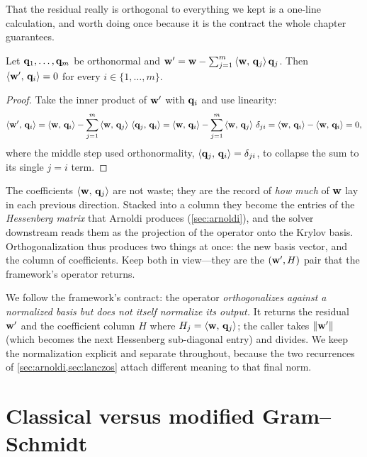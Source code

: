 That the residual really is orthogonal to everything we kept is a one-line
calculation, and worth doing once because it is the contract the whole chapter
guarantees.

\begin{lemma}
\label{lem:residorthog}
Let $\mathbf{q}_1,\dots,\mathbf{q}_m$ be orthonormal and
$\mathbf{w}' = \mathbf{w} - \sum_{j=1}^m \left\langle \mathbf{w},\, \mathbf{q}_j\right\rangle\mathbf{q}_j$. Then
$\left\langle \mathbf{w}',\, \mathbf{q}_i\right\rangle = 0$ for every $i \in \{1,\dots,m\}$.
\end{lemma}
\begin{proof}
Take the inner product of $\mathbf{w}'$ with $\mathbf{q}_i$ and use linearity:
\[
  \left\langle \mathbf{w}',\, \mathbf{q}_i\right\rangle
    = \left\langle \mathbf{w},\, \mathbf{q}_i\right\rangle - \sum_{j=1}^m \left\langle \mathbf{w},\, \mathbf{q}_j\right\rangle\,\left\langle \mathbf{q}_j,\, \mathbf{q}_i\right\rangle
    = \left\langle \mathbf{w},\, \mathbf{q}_i\right\rangle - \sum_{j=1}^m \left\langle \mathbf{w},\, \mathbf{q}_j\right\rangle\,\delta_{ji}
    = \left\langle \mathbf{w},\, \mathbf{q}_i\right\rangle - \left\langle \mathbf{w},\, \mathbf{q}_i\right\rangle = 0,
\]
where the middle step used orthonormality, $\left\langle \mathbf{q}_j,\, \mathbf{q}_i\right\rangle = \delta_{ji}$, to
collapse the sum to its single $j = i$ term. \qedhere
\end{proof}

The coefficients $\left\langle \mathbf{w},\, \mathbf{q}_j\right\rangle$ are not waste; they are the record of
\emph{how much} of $\mathbf{w}$ lay in each previous direction. Stacked into a column they
become the entries of the \emph{Hessenberg matrix} that Arnoldi produces
(\cref{sec:arnoldi}), and the solver downstream reads them as the projection of the
operator onto the Krylov basis. Orthogonalization thus produces two things at once:
the new basis vector, and the column of coefficients. Keep both in view---they are
the $(\mathbf{w}', H)$ pair that the framework's  operator returns.

\begin{notationbox}
We follow the framework's  contract: the operator
\emph{orthogonalizes against a normalized basis but does not itself normalize its
output.} It returns the residual $\mathbf{w}'$ and the coefficient column $H$ where
$H_j = \left\langle \mathbf{w},\, \mathbf{q}_j\right\rangle$; the caller takes $\lVert\mathbf{w}'\rVert$ (which becomes the next
Hessenberg sub-diagonal entry) and divides. We keep the normalization explicit and
separate throughout, because the two recurrences of \cref{sec:arnoldi,sec:lanczos}
attach different meaning to that final norm.
\end{notationbox}

\section{Classical versus modified Gram--Schmidt}
\label{sec:cgsmgs}

